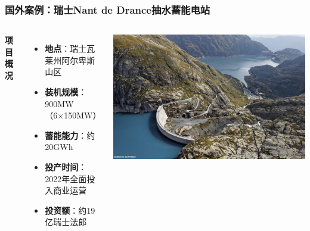 \documentclass[aspectratio=169]{beamer}
\begin{document}
\begin{frame}
    \frametitle{国外案例：瑞士Nant de Drance抽水蓄能电站}
    \begin{columns}
        \textbf{项目概况}
        \begin{itemize}
            \item \textbf{地点}：瑞士瓦莱州阿尔卑斯山区
            \item \textbf{装机规模}：900MW（6×150MW）
            \item \textbf{蓄能能力}：约20GWh
            \item \textbf{投产时间}：2022年全面投入商业运营
            \item \textbf{投资额}：约19亿瑞士法郎
        \end{itemize}
        
        \centering
        \includegraphics[width=\textwidth]{fig/Nant de Drance电站.jpg}
    \end{columns}
\end{frame}
\end{document}
